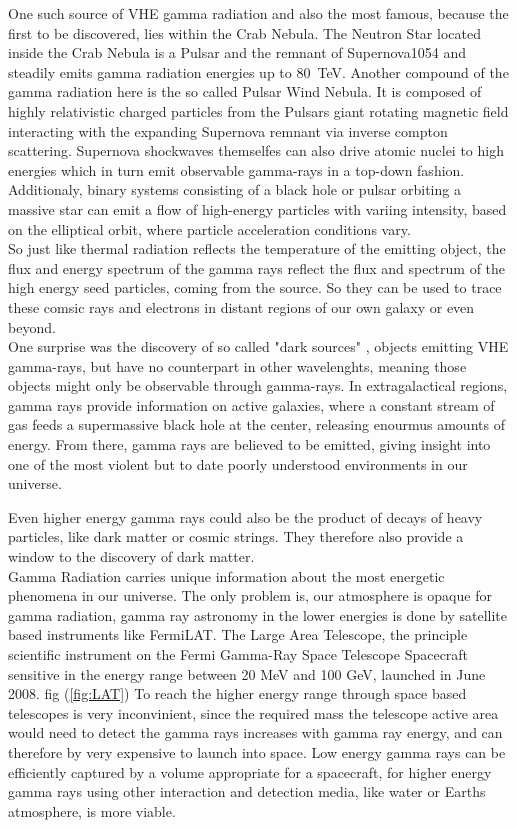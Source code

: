 \documentclass[12pt,article,type=msc,colorback,accentcolor=tud9c]{tudthesis}
\begin{document}
One such source of VHE gamma radiation and also the most famous, because the first to be discovered, lies within the Crab Nebula. The Neutron Star located inside the Crab Nebula is a Pulsar and the remnant of Supernova1054 and steadily emits gamma radiation energies up to 80~TeV. Another compound of the gamma radiation here is the so called Pulsar Wind Nebula. It is composed of highly relativistic charged particles from the Pulsars giant rotating magnetic field interacting with the expanding Supernova remnant via inverse compton scattering. Supernova shockwaves themselfes can also drive atomic nuclei to high energies which in turn emit observable gamma-rays in a top-down fashion. Additionaly, binary systems consisting of a black hole or pulsar orbiting a massive star can emit a flow of high-energy particles with variing intensity, based on the elliptical orbit, where particle acceleration conditions vary.\\
So just like thermal radiation reflects the temperature of the emitting object, the flux and energy spectrum of the gamma rays reflect the flux and spectrum of the high energy seed particles, coming from the source. So they can be used to trace these comsic rays and electrons in distant regions of our own galaxy or even beyond. \\
One surprise was the discovery of so called "dark sources" , objects emitting VHE gamma-rays, but have no counterpart in other wavelenghts, meaning those objects might only be observable through gamma-rays. In extragalactical regions, gamma rays provide information on active galaxies, where a constant stream of gas feeds a supermassive black hole at the center, releasing enourmus amounts of energy. From there, gamma rays are believed to be emitted, giving insight into one of the most violent but to date poorly understood environments in our universe. 

Even higher energy gamma rays could also be the product of decays of heavy particles, like dark matter or cosmic strings. They therefore also provide a window to the discovery of dark matter.\\

Gamma Radiation carries unique information about the most energetic phenomena in our universe. 
The only problem is, our atmosphere is opaque for gamma radiation, gamma ray astronomy in the lower energies is done by satellite based instruments like FermiLAT. The Large Area Telescope, the principle scientific instrument on the Fermi Gamma-Ray Space Telescope Spacecraft sensitive in the energy range between 20 MeV and 100 GeV, launched in June 2008. fig (\ref{fig:LAT}) To reach the higher energy range through space based telescopes is very inconvinient, since the required mass the telescope active area would need to detect the gamma rays increases with gamma ray energy, and can therefore by very expensive to launch into space. Low energy gamma rays can be efficiently captured by a volume appropriate for a spacecraft, for higher energy gamma rays using other interaction and detection media, like water or Earths atmosphere, is more viable.
\end{document}
